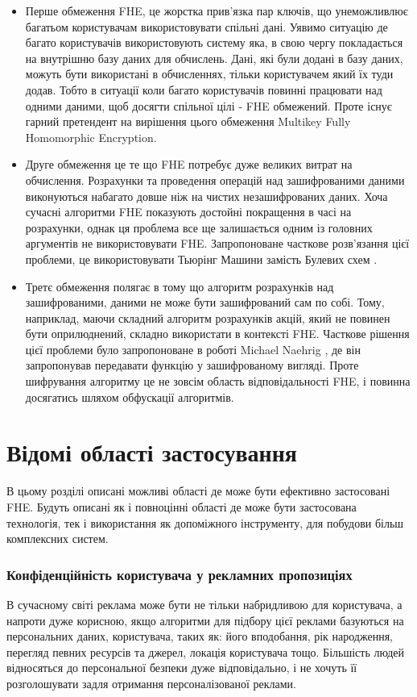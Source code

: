 \begin{itemize}
    \item Перше обмеження FHE, це жорстка прив'язка пар ключів, що унеможливлює багатьом користувачам використовувати спільні дані. Уявимо ситуацію де багато
користувачів використовують систему яка, в свою чергу покладається на внутрішню базу 
даних для обчислень. Дані, які були додані в базу даних, можуть бути використані в
обчисленнях, тільки користувачем який їх туди додав. Тобто в ситуації коли багато 
користувачів повинні працювати над одними даними, щоб досягти спільної цілі - FHE 
обмежений. Проте існує гарний претендент на вирішення цього обмеження \cite{cryptoeprint:2013/094} Multikey Fully Homomorphic Encryption.

    \item Друге обмеження це те що FHE потребує дуже великих витрат на обчислення.
Розрахунки та проведення операцій над зашифрованими даними виконуються набагато довше ніж
на чистих незашифрованих даних. Хоча сучасні алгоритми FHE показують достойні 
покращення в часі на розрахунки, однак ця проблема все ще залишається одним із головних
аргументів не використовувати FHE. Запропоноване часткове розв'язання цієї проблеми, це 
використовувати Тьюрінг Машини замість Булевих схем \cite{10.1007/978-3-642-40084-1_30}.

    \item Третє обмеження полягає в тому що алгоритм розрахунків над зашифрованими,
даними не може бути зашифрований сам по собі. Тому, наприклад, маючи складний
алгоритм розрахунків акцій, який не повинен бути оприлюднений, складно використати в
контексті FHE. Часткове рішення цієї проблеми було запропоноване в роботі Michael 
Naehrig \cite{10.1145/2046660.2046682}, де він запропонував передавати функцію у зашифрованому вигляді.
Проте шифрування алгоритму це не зовсім область відповідальності FHE, і повинна
досягатись шляхом обфускації алгоритмів.

\end{itemize}

\section{Відомі області застосування}
В цьому розділі описані можливі області де може бути ефективно застосовані FHE. Будуть
описані як і повноцінні області де може бути застосована технологія, тек і використання
як допоміжного інструменту, для побудови більш комплексних систем.

\subsubsection*{Конфіденційність користувача у рекламних пропозиціях}
В сучасному світі реклама може бути не тільки набридливою для користувача, а напроти дуже
корисною, якщо алгоритми для підбору цієї реклами базуються на персональних даних,
користувача, таких як: його вподобання, рік народження, перегляд певних ресурсів та джерел,
локація  користувача тощо. Більшість людей відносяться до персональної безпеки дуже
відповідально, і не хочуть її розголошувати задля отримання персоналізованої реклами.

